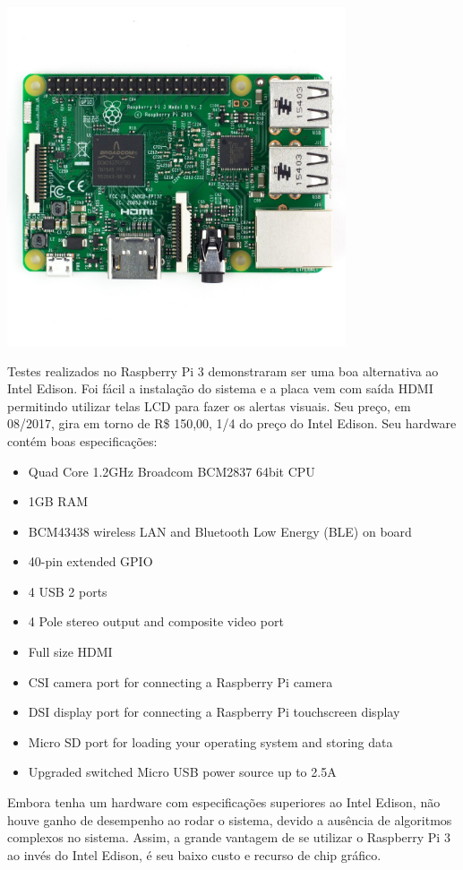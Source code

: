 \documentclass[
	12pt,				%
	oneside,			%
	a4paper,			%
	brazil				%
]{abntex2}
\begin{document}
\includegraphics[width=10cm, center]{images/raspberry-pi}

Testes realizados no Raspberry Pi 3 demonstraram ser uma boa alternativa ao Intel Edison. Foi fácil a instalação do sistema e a placa vem com saída HDMI permitindo utilizar telas LCD para fazer os alertas visuais.
Seu preço, em 08/2017, gira em torno de R\$ 150,00, 1/4 do preço do Intel Edison. Seu hardware contém boas especificações:

\begin{itemize}
\item Quad Core 1.2GHz Broadcom BCM2837 64bit CPU
\item 1GB RAM
\item BCM43438 wireless LAN and Bluetooth Low Energy (BLE) on board
\item 40-pin extended GPIO
\item 4 USB 2 ports
\item 4 Pole stereo output and composite video port
\item Full size HDMI
\item CSI camera port for connecting a Raspberry Pi camera
\item DSI display port for connecting a Raspberry Pi touchscreen display
\item Micro SD port for loading your operating system and storing data
\item Upgraded switched Micro USB power source up to 2.5A
\end{itemize}

Embora tenha um hardware com especificações superiores ao Intel Edison, não houve ganho de desempenho ao rodar o sistema, devido a ausência de algoritmos complexos no sistema. Assim, a grande vantagem de se utilizar o Raspberry Pi 3 ao invés do Intel Edison, é seu baixo custo e recurso de chip gráfico.
\end{document}
